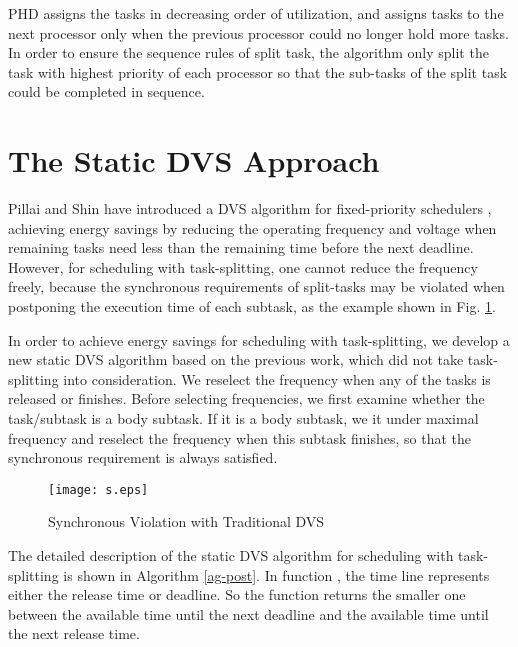 \documentclass[12pt, journal,compsoc]{IEEEtran}
\begin{document}
PHD assigns the tasks in decreasing order of utilization, and assigns tasks to the next processor only when the previous processor could no longer hold more tasks. In order to ensure the sequence rules of split task, the algorithm only split the task with highest priority of each processor so that the sub-tasks of the split task could be completed in sequence.

\section{The Static DVS Approach}
\label{post}

Pillai and Shin have introduced a DVS algorithm for fixed-priority schedulers \cite{Pillai:2001:RDV:502034.502044}, achieving energy savings by reducing the operating frequency and voltage when remaining tasks need less than the remaining time before the next deadline. However, for scheduling with task-splitting, one cannot reduce the frequency freely, because the synchronous requirements of split-tasks may be violated when postponing the execution time of each subtask, as the example shown in Fig. \ref{SVTD}.

In order to achieve energy savings for scheduling with task-splitting, we develop a new static DVS algorithm based on the previous work, which did not take task-splitting into consideration. We reselect the frequency when any of the tasks is released or finishes.
Before selecting frequencies, we first examine whether the task/subtask is a body subtask. If it is a body subtask, we   it under maximal frequency and reselect the frequency when this subtask finishes, so that the synchronous requirement is always satisfied.

\begin{figure}[t]
\centering
\texttt{[image: s.eps]}
\caption{Synchronous Violation with Traditional DVS}
\label{SVTD}
\end{figure}

The detailed description of the static DVS algorithm for scheduling with task-splitting is shown in Algorithm \ref{ag-post}. In function , the time line represents either the release time or deadline. So the function returns the smaller one between the available time until the next deadline and the available time until the next release time.
\end{document}
